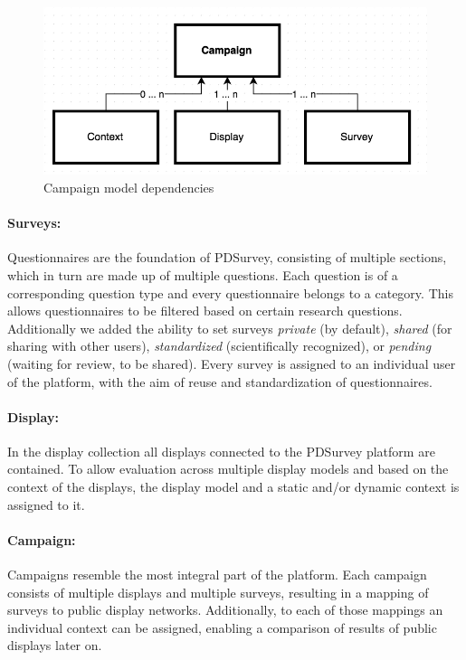 \begin{figure}[bph]
    \begin{center}
        \includegraphics[width=.8\columnwidth]{img/4_implementation/4-dependency-campaign}
    \end{center}
 \caption{Campaign model dependencies}
 \label{fig:4-dependency-campaign}
\end{figure}


	\paragraph{Surveys:} Questionnaires are the foundation of PDSurvey, consisting of multiple sections, which in turn are made up of multiple questions. Each question is of a corresponding question type and every questionnaire belongs to a category. This allows questionnaires to be filtered based on certain research questions. Additionally we added the ability to set surveys \textit{private} (by default), \textit{shared} (for sharing with other users), \textit{standardized} (scientifically recognized), or \textit{pending} (waiting for review, to be shared). Every survey is assigned to an individual user of the platform, with the aim of reuse and standardization of questionnaires.

	\paragraph{Display:} In the display collection all displays connected to the PDSurvey platform are contained. To allow evaluation across multiple display models and based on the context of the displays, the display model and a static and/or dynamic context is assigned to it.

	\paragraph{Campaign:} Campaigns resemble the most integral part of the platform. Each campaign consists of multiple displays and multiple surveys, resulting in a mapping of  surveys to public display networks. Additionally, to each of those mappings an individual context can be assigned, enabling a comparison of results of public displays later on.

